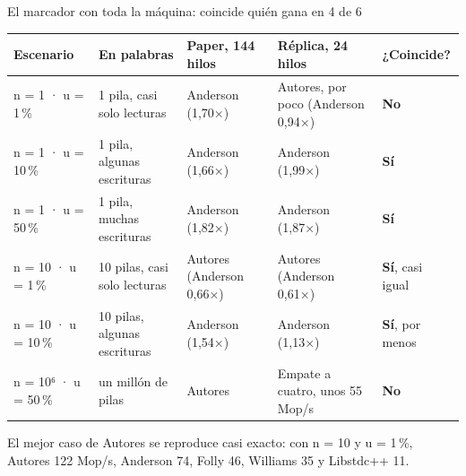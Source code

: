 \begin{frame}{El marcador con toda la máquina: coincide quién gana en 4 de 6}
  \footnotesize
  \begin{tabularx}{\linewidth}{@{}p{23mm}p{36mm}p{27mm}Xp{19mm}@{}}
    \toprule
    \textbf{Escenario} & \textbf{En palabras} & \textbf{Paper, 144 hilos} & \textbf{Réplica, 24 hilos} & \textbf{¿Coincide?}\\
    \midrule
    n = 1 · u = 1\,\% & 1 pila, casi solo lecturas & Anderson (1,70×) & Autores, por poco (Anderson 0,94×) & \textcolor{mal}{\textbf{No}}\\
    n = 1 · u = 10\,\% & 1 pila, algunas escrituras & Anderson (1,66×) & Anderson (1,99×) & \textcolor{bien}{\textbf{Sí}}\\
    n = 1 · u = 50\,\% & 1 pila, muchas escrituras & Anderson (1,82×) & Anderson (1,87×) & \textcolor{bien}{\textbf{Sí}}\\
    n = 10 · u = 1\,\% & 10 pilas, casi solo lecturas & Autores (Anderson 0,66×) & Autores (Anderson 0,61×) & \textcolor{bien}{\textbf{Sí}}, casi igual\\
    n = 10 · u = 10\,\% & 10 pilas, algunas escrituras & Anderson (1,54×) & Anderson (1,13×) & \textcolor{bien}{\textbf{Sí}}, por menos\\
    n = 10⁶ · u = 50\,\% & un millón de pilas & Autores & Empate a cuatro, unos 55 Mop/s & \textcolor{mal}{\textbf{No}}\\
    \bottomrule
  \end{tabularx}
  \vspace{2mm}
  \begin{idea}\footnotesize El mejor caso de Autores se reproduce casi exacto: con n = 10 y u = 1\,\%, Autores 122 Mop/s, Anderson 74, Folly 46, Williams 35 y Libstdc++ 11.\end{idea}
\end{frame}


